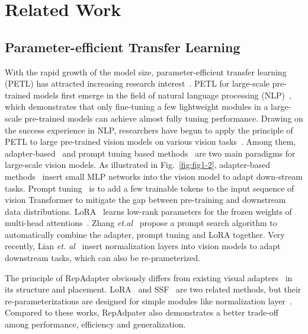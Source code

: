 \section{Related Work}
\subsection{Parameter-efficient Transfer Learning} With the rapid growth of the model size, parameter-efficient transfer learning (PETL) has attracted increasing research interest~\cite{adapter,prefix,ppt,ppp,autoprompt,zhong2021factual,vpt,lora,adaptformer,noah,cocoop,coop,vladapter}. PETL for large-scale pre-trained models first emerge in the field of natural language processing (NLP)~\cite{adapter,prefix,ppt,ppp,autoprompt,zhong2021factual,lora}, which demonstrates that only fine-tuning a few lightweight modules in a large-scale pre-trained models can achieve almost  fully tuning  performance.  Drawing on the success experience in NLP, researchers have begun to apply the principle of PETL to large pre-trained vision models on various vision tasks~\cite{adaptformer,adapter,vladapter,cocoop,coop,noah}.   Among them, adapter-based~\cite{adaptformer,adapter,vladapter} and prompt tuning based  methods~\cite{cocoop,coop}  are two main paradigms for  large-scale vision models. As illustrated in Fig.~\ref{fig:fig1-2},  adapter-based methods~\cite{adaptformer,adapter,vladapter}  insert small  MLP networks  into the vision model to adapt   down-stream tasks. Prompt tuning~\cite{cocoop,coop} is to add a few trainable tokens  to the input sequence of vision Transformer to mitigate the gap between pre-training and downstream data distributions.   LoRA~\cite{lora}    learns low-rank parameters  for  the frozen weights of multi-head attentions~\cite{transformer}.    Zhang \emph{et.al}~\cite{noah} propose a prompt search algorithm to  automatically combine the adapter, prompt tuning and LoRA  together. Very recently, Lian \textit{et. al}~\cite{ssf} insert normalization layers into vision models to adapt downstream tasks, which can also be re-prameterized.

The principle of RepAdapter obviously differs from existing  visual adapters~\cite{adapter,adaptformer,noah} in its structure and placement.   LoRA~\cite{lora} and SSF~\cite{ssf} are two related methods, but their re-parameterizations are designed for simple  modules like normalization layer~\cite{ssf}.   Compared to these works, RepAdpater also demonstrates a better trade-off  among performance, efficiency and  generalization. 

